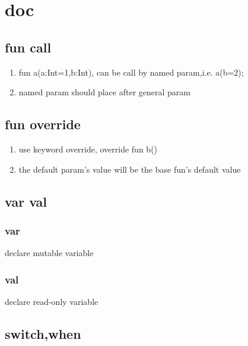 \documentclass{article}
\begin{document}
\section{doc}
    \subsection{fun call}
         \begin{enumerate}
            \item fun a(a:Int=1,b:Int){}, can be call by named param,i.e. a(b=2);
            \item named param should place after general param
         \end{enumerate}
    \subsection{fun override}
         \begin{enumerate}
             \item use keyword override, override fun b(){}
             \item the default param's value will be the base fun's default value
         \end{enumerate}
    \subsection{var val}
         \subsubsection{var}
            declare mutable variable
         \subsubsection{val}
            declare read-only variable
    \subsection{switch,when}
         
\end{document}
